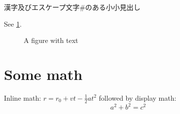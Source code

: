 \documentclass{book}
\begin{document}
漢字及びエスケープ文字\#のある小小見出し

See \cref{fig:withtext}.

\begin{figure}\begin{center}
\fbox{\textcolor{blue!50!green}{Text in a figure.}}
\caption{A figure with text\label{fig:withtext}}
\end{center}\end{figure}

\section{Some math}

Inline math: $r = r_0 + vt - \frac{1}{2}at^2$
followed by display math:
\begin{equation}
a^2 + b^2 = c^2
\end{equation}


\begin{warpprint}   %
\cleardoublepage    %
{}
\end{warpprint}
\ForceHTMLPage      %
\ForceHTMLTOC       %
\printindex
\end{document}

